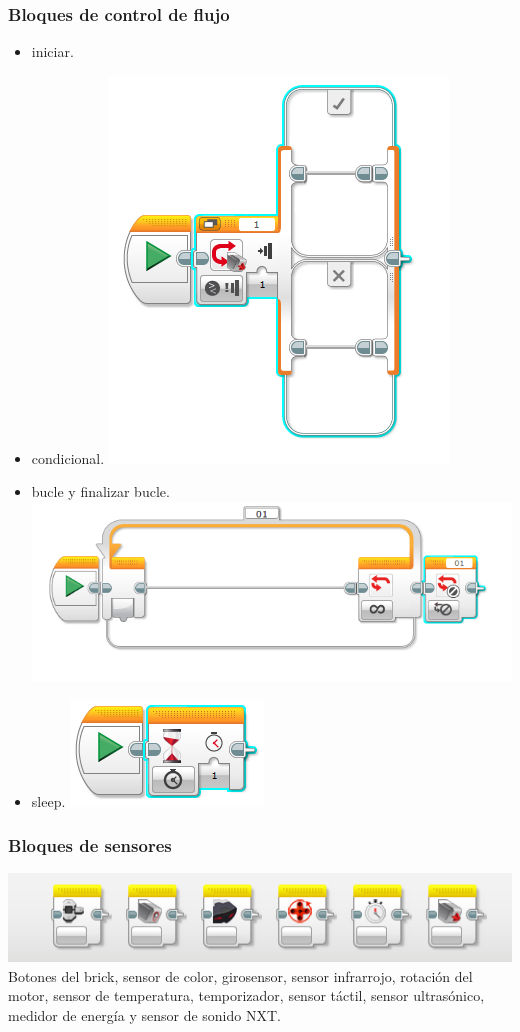 \documentclass[12pt,a4paper]{article}
\begin{document}
\subsubsection{Bloques de control de flujo}
\begin{itemize}
\item iniciar.
\item condicional.
\includegraphics[scale=0.5]{condicional.PNG}
\item bucle y finalizar bucle.
\includegraphics[scale=0.5]{bucle.PNG}
\item sleep.
\includegraphics[scale=0.5]{sleep.PNG}
\end{itemize}
\subsubsection{Bloques de sensores}
\includegraphics[scale=0.5]{sensores.PNG}
Botones del brick, sensor de color, girosensor, sensor infrarrojo, rotación del motor, sensor de temperatura, temporizador, sensor táctil, sensor ultrasónico, medidor de energía y sensor de sonido NXT.
\end{document}
